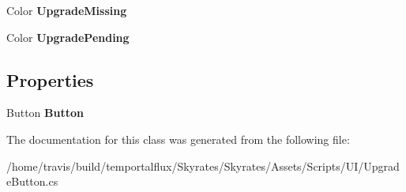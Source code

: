\begin{DoxyCompactItemize}
\item 
\hypertarget{class_skyrates_1_1_u_i_1_1_upgrade_button_ad34afcd2f63fd7934338eeee3d45180f}{Color {\bfseries Upgrade\-Missing}}\label{class_skyrates_1_1_u_i_1_1_upgrade_button_ad34afcd2f63fd7934338eeee3d45180f}

\item 
\hypertarget{class_skyrates_1_1_u_i_1_1_upgrade_button_acce9d86d946af9a5bc4151d658c1754f}{Color {\bfseries Upgrade\-Pending}}\label{class_skyrates_1_1_u_i_1_1_upgrade_button_acce9d86d946af9a5bc4151d658c1754f}

\end{DoxyCompactItemize}
\subsection*{Properties}
\begin{DoxyCompactItemize}
\item 
\hypertarget{class_skyrates_1_1_u_i_1_1_upgrade_button_aa720529e84ad6117fe047afc1357abfb}{Button {\bfseries Button}}\label{class_skyrates_1_1_u_i_1_1_upgrade_button_aa720529e84ad6117fe047afc1357abfb}

\end{DoxyCompactItemize}


The documentation for this class was generated from the following file\-:\begin{DoxyCompactItemize}
\item 
/home/travis/build/temportalflux/\-Skyrates/\-Skyrates/\-Assets/\-Scripts/\-U\-I/Upgrade\-Button.\-cs\end{DoxyCompactItemize}
